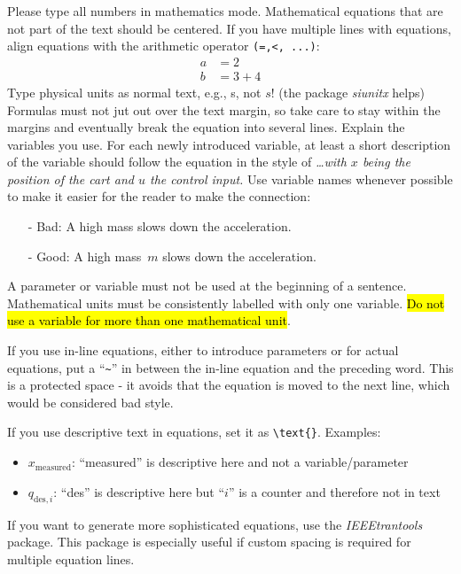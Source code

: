 Please type all numbers in mathematics mode.
Mathematical equations that are not part of the text should be centered. If you have multiple lines with equations, align equations with the arithmetic operator \verb|(=,<, ...)|:
\begin{subequations}
\begin{align}
a &= 2\\
b&= 3+4
\end{align}
\end{subequations}
Type physical units as normal text, e.g., s, not $s$! (the package \textit{siunitx} helps)
Formulas must not jut out over the text margin, so take care to stay within the margins and eventually break the equation into several lines.
Explain the variables you use. For each newly introduced variable, at least a short description of the variable should follow the equation in the style of \emph{\ldots with $x$ being the position of the cart and $u$ the control input.} Use variable names whenever possible to make it easier for the reader to make the connection: 
\begin{itemize}
\item[-] Bad: A high mass slows down the acceleration. 
\item[-] Good: A high mass~$m$ slows down the acceleration.
\end{itemize}
A parameter or variable must not be used at the beginning of a sentence.
Mathematical units must be consistently labelled with only one variable. \hl{Do not
use a variable for more than one mathematical unit}.

If you use in-line equations, either to introduce parameters or for actual equations, put a ``\verb|~|'' in between the in-line equation and the preceding word. This is a protected space - it avoids that the equation is moved to the next line, which would be considered bad style. 

If you use descriptive text in equations, set it as \verb|\text{}|. Examples:
\begin{itemize}
	\item $x_{\text{measured}}$: ``measured'' is descriptive here and not a variable/parameter 
	\item $q_{\text{des},i}$: ``des'' is descriptive here but ``$i$'' is a counter and therefore not in text 
\end{itemize}

If you want to generate more sophisticated equations, use the \textit{IEEEtrantools} package. 
This package is especially useful if custom spacing is required for multiple equation lines.

